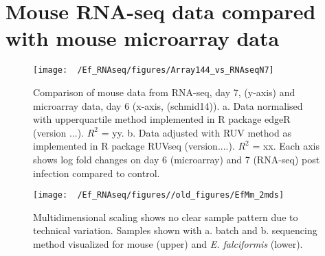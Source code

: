 \documentclass{article}
\begin{document}
\section{Mouse RNA-seq data compared with mouse microarray data}
\begin{figure}[h]
\begin{center}
\texttt{[image: ~/Ef\_RNAseq/figures/Array144\_vs\_RNAseqN7]} %
\caption{Comparison of mouse data from RNA-seq, day 7, (y-axis) and microarray data, day 6 (x-axis, (schmid14)). a. Data normalised with upperquartile method implemented in R package edgeR (version ...). $R^2$ = yy. b. Data adjusted with RUV method as implemented in R package RUVseq (version....). $R^2$ = xx. Each axis shows log fold changes on day 6 (microarray) and 7 (RNA-seq) post infection compared to control.}
\end{center}
\end{figure}

\begin{figure}[h]
\begin{center}
\texttt{[image: ~/Ef\_RNAseq/figures//old\_figures/EfMm\_2mds]} %
	\caption{Multidimensional scaling shows no clear sample pattern due to technical variation. Samples shown with a. batch and b. sequencing method visualized for mouse (upper) and \emph{E. falciformis} (lower).}
\end{center}
\end{figure}
\end{document}
